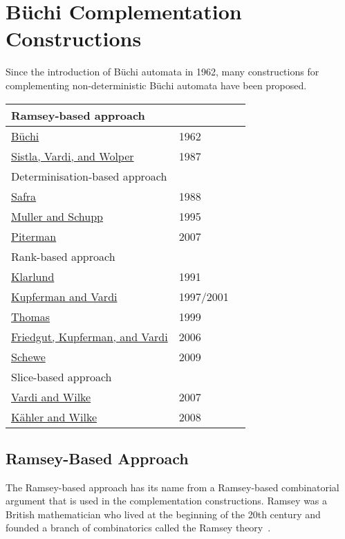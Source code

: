 \section{Büchi Complementation Constructions}
\label{2_review}


Since the introduction of Büchi automata in 1962, many constructions for complementing non-deterministic Büchi automata have been proposed. 


\newcommand{\ii}{\hspace{5mm}}
\newcommand{\vstrut}{\vphantom{$2^{2^2}$}}
\begin{longtable}[l]{lll}
\multicolumn{3}{l}{Ramsey-based approach} \\
\hline
\ii\hyperref[2_buchi62]{Büchi} & 1962 & \cite{buchi1960decision} \\
\ii\hyperref[2_svw87]{Sistla, Vardi, and Wolper} & 1987 & \cite{1985_sistla,PrasadSistla1987217} \\
\multicolumn{3}{l}{Determinisation-based approach\vstrut} \\
\hline
\ii\hyperref[2_safra88]{Safra} & 1988 & \cite{1988_safra_2,1988_safra_1} \\
\ii\hyperref[2_ms95]{Muller and Schupp} & 1995 & \cite{Muller199569} \\
\ii\hyperref[2_pit07]{Piterman} & 2007 & \cite{2006_piterman,2007_piterman} \\
\multicolumn{3}{l}{Rank-based approach\vstrut} \\
\hline
\ii\hyperref[2_kla91]{Klarlund} & 1991 & \cite{1991_klarlund} \\
\ii\hyperref[2_kv01]{Kupferman and Vardi} & 1997/2001 & \cite{1997_vardi,Kupferman:2001} \\
\ii\hyperref[2_th99]{Thomas} & 1999 & \cite{1999_thomas} \\
\ii\hyperref[2_fkv06]{Friedgut, Kupferman, and Vardi} & 2006 & \cite{2004_friedgut,friedgut2006buchi} \\
\ii\hyperref[2_schewe09]{Schewe} & 2009 & \cite{schewe2009buchi} \\
\multicolumn{3}{l}{Slice-based approach\vstrut} \\
\hline
\ii\hyperref[2_vw07]{Vardi and Wilke} & 2007 & \cite{vardi2007automata} \\
\ii\hyperref[2_kw08]{Kähler and Wilke} & 2008 & \cite{2008_kaehler} \\
\end{longtable}



\subsection{Ramsey-Based Approach}
\label{2_ramsey-based}
The Ramsey-based approach has its name from a Ramsey-based combinatorial argument that is used in the complementation constructions. Ramsey was a British mathematician who lived at the beginning of the 20th century and founded a branch of combinatorics called the Ramsey theory~\cite{graham1990ramsey}.

